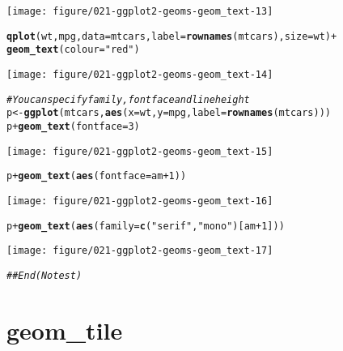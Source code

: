 \documentclass[a4paper,titlepage]{tufte-handout}\usepackage[]{graphicx}\usepackage[]{color}
\makeatletter
\def\maxwidth{ %
  \ifdim\Gin@nat@width>\linewidth
    \linewidth
  \else
    \Gin@nat@width
  \fi
}
\newcommand{\hlnum}[1]{\textcolor[rgb]{0.686,0.059,0.569}{#1}}%
\newcommand{\hlstr}[1]{\textcolor[rgb]{0.192,0.494,0.8}{#1}}%
\newcommand{\hlcom}[1]{\textcolor[rgb]{0.678,0.584,0.686}{\textit{#1}}}%
\newcommand{\hlopt}[1]{\textcolor[rgb]{0,0,0}{#1}}%
\newcommand{\hlstd}[1]{\textcolor[rgb]{0.345,0.345,0.345}{#1}}%
\newcommand{\hlkwb}[1]{\textcolor[rgb]{0.69,0.353,0.396}{#1}}%
\newcommand{\hlkwc}[1]{\textcolor[rgb]{0.333,0.667,0.333}{#1}}%
\newcommand{\hlkwd}[1]{\textcolor[rgb]{0.737,0.353,0.396}{\textbf{#1}}}%
\newenvironment{kframe}{%
 \def\at@end@of@kframe{}%
 \ifinner\ifhmode%
  \def\at@end@of@kframe{\end{minipage}}%
  \begin{minipage}{\columnwidth}%
 \fi\fi%
 \def\FrameCommand##1{\hskip\@totalleftmargin \hskip-\fboxsep
 \colorbox{shadecolor}{##1}\hskip-\fboxsep
     \hskip-\linewidth \hskip-\@totalleftmargin \hskip\columnwidth}%
 \MakeFramed {\advance\hsize-\width
   \@totalleftmargin\z@ \linewidth\hsize
   \@setminipage}}%
 {\par\unskip\endMakeFramed%
 \at@end@of@kframe}
\newenvironment{knitrout}{}{} %
\makeatother
\begin{document}
\begin{knitrout}
\begin{kframe}
\end{kframe}
\texttt{[image: figure/021-ggplot2-geoms-geom\_text-13]} 
\begin{kframe}\begin{alltt}
\hlkwd{qplot}\hlstd{(wt, mpg,} \hlkwc{data} \hlstd{= mtcars,} \hlkwc{label} \hlstd{=} \hlkwd{rownames}\hlstd{(mtcars),} \hlkwc{size} \hlstd{= wt)} \hlopt{+}
  \hlkwd{geom_text}\hlstd{(}\hlkwc{colour} \hlstd{=} \hlstr{"red"}\hlstd{)}
\end{alltt}
\end{kframe}
\texttt{[image: figure/021-ggplot2-geoms-geom\_text-14]} 
\begin{kframe}\begin{alltt}
\hlcom{# You can specify family, fontface and lineheight}
\hlstd{p} \hlkwb{<-} \hlkwd{ggplot}\hlstd{(mtcars,} \hlkwd{aes}\hlstd{(}\hlkwc{x}\hlstd{=wt,} \hlkwc{y}\hlstd{=mpg,} \hlkwc{label}\hlstd{=}\hlkwd{rownames}\hlstd{(mtcars)))}
\hlstd{p} \hlopt{+} \hlkwd{geom_text}\hlstd{(}\hlkwc{fontface}\hlstd{=}\hlnum{3}\hlstd{)}
\end{alltt}
\end{kframe}
\texttt{[image: figure/021-ggplot2-geoms-geom\_text-15]} 
\begin{kframe}\begin{alltt}
\hlstd{p} \hlopt{+} \hlkwd{geom_text}\hlstd{(}\hlkwd{aes}\hlstd{(}\hlkwc{fontface}\hlstd{=am}\hlopt{+}\hlnum{1}\hlstd{))}
\end{alltt}
\end{kframe}
\texttt{[image: figure/021-ggplot2-geoms-geom\_text-16]} 
\begin{kframe}\begin{alltt}
\hlstd{p} \hlopt{+} \hlkwd{geom_text}\hlstd{(}\hlkwd{aes}\hlstd{(}\hlkwc{family}\hlstd{=}\hlkwd{c}\hlstd{(}\hlstr{"serif"}\hlstd{,} \hlstr{"mono"}\hlstd{)[am}\hlopt{+}\hlnum{1}\hlstd{]))}
\end{alltt}
\end{kframe}
\texttt{[image: figure/021-ggplot2-geoms-geom\_text-17]} 
\begin{kframe}\begin{alltt}
\hlcom{## End(No test)}
\end{alltt}
\end{kframe}
\end{knitrout}


\section{geom\_tile}
\end{document}
